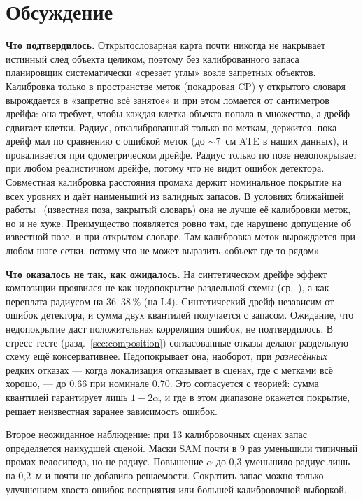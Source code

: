 \section{Обсуждение}

\textbf{Что подтвердилось.} Открытословарная карта почти никогда не накрывает истинный след объекта целиком, поэтому без калиброванного запаса планировщик систематически «срезает углы» возле запретных объектов. Калибровка только в пространстве меток (покадровая CP) у открытого словаря вырождается в «запретно всё занятое» и при этом ломается от сантиметров дрейфа: она требует, чтобы каждая клетка объекта попала в множество, а дрейф сдвигает клетки. Радиус, откалиброванный только по меткам, держится, пока дрейф мал по сравнению с ошибкой меток (до $\sim$7~см ATE в наших данных), и проваливается при одометрическом дрейфе. Радиус только по позе недопокрывает при любом реалистичном дрейфе, потому что не видит ошибок детектора. Совместная калибровка расстояния промаха держит номинальное покрытие на всех уровнях и даёт наименьший из валидных запасов. В условиях ближайшей работы~\cite{sundarsingh} (известная поза, закрытый словарь) она не лучше её калибровки меток, но и не хуже. Преимущество появляется ровно там, где нарушено допущение об известной позе, и при открытом словаре. Там калибровка меток вырождается при любом шаге сетки, потому что не может выразить «объект где-то рядом».

\textbf{Что оказалось не так, как ожидалось.} На синтетическом дрейфе эффект композиции проявился не как недопокрытие раздельной схемы (ср.~\cite{baral}), а как переплата радиусом на $36$--$38\,\%$ (на L4). Синтетический дрейф независим от ошибок детектора, и сумма двух квантилей получается с запасом. Ожидание, что недопокрытие даст положительная корреляция ошибок, не подтвердилось. В стресс-тесте (разд.~\ref{sec:composition}) согласованные отказы делают раздельную схему ещё консервативнее. Недопокрывает она, наоборот, при \emph{разнесённых} редких отказах --- когда локализация отказывает в сценах, где с метками всё хорошо, --- до 0{,}66 при номинале 0{,}70. Это согласуется с теорией: сумма квантилей гарантирует лишь $1-2\alpha$, и где в этом диапазоне окажется покрытие, решает неизвестная заранее зависимость ошибок.

Второе неожиданное наблюдение: при 13 калибровочных сценах запас определяется наихудшей сценой. Маски SAM почти в 9 раз уменьшили типичный промах велосипеда, но не радиус. Повышение $\alpha$ до 0{,}3 уменьшило радиус лишь на 0{,}2~м и почти не добавило решаемости. Сократить запас можно только улучшением хвоста ошибок восприятия или большей калибровочной выборкой.

